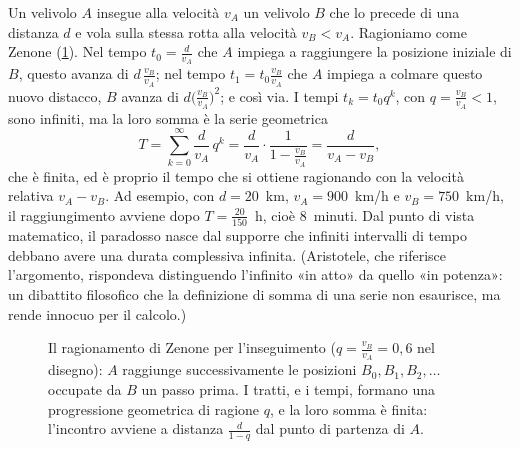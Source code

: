 \begin{idea}
Un velivolo $A$ insegue alla velocità $v_{A}$ un velivolo $B$ che lo precede di una
distanza $d$ e vola sulla stessa rotta alla velocità $v_{B}<v_{A}$. Ragioniamo come
Zenone (\cref{fig:zenone}). Nel tempo $t_{0}=\frac d{v_{A}}$ che $A$ impiega a raggiungere la
posizione iniziale di $B$, questo avanza di $d\,\frac{v_{B}}{v_{A}}$; nel tempo $t_{1}=t_{0}\frac{v_{B}}{v_{A}}$ che
$A$ impiega a colmare questo nuovo distacco, $B$ avanza di $d\bigl(\frac{v_{B}}{v_{A}}\bigr)^{2}$; e così
via. I tempi $t_{k}=t_{0}q^{k}$, con $q=\frac{v_{B}}{v_{A}}<1$, sono infiniti, ma la loro somma è la
serie geometrica
\[
  T=\sum_{k=0}^{\infty}\frac d{v_{A}}\,q^{k}=\frac d{v_{A}}\cdot\frac1{1-\frac{v_{B}}{v_{A}}}=\frac d{v_{A}-v_{B}} ,
\]
che è finita, ed è proprio il tempo che si ottiene ragionando con la velocità relativa
$v_{A}-v_{B}$. Ad esempio, con $d=20$~km, $v_{A}=900$~km/h e $v_{B}=750$~km/h, il
raggiungimento avviene dopo $T=\frac{20}{150}$~h, cioè $8$~minuti. Dal punto di vista matematico, il
paradosso nasce dal supporre che infiniti intervalli di tempo debbano avere una durata
complessiva infinita. (Aristotele, che riferisce l'argomento, rispondeva distinguendo
l'infinito «in atto» da quello «in potenza»: un dibattito filosofico che la definizione
di somma di una serie non esaurisce, ma rende innocuo per il calcolo.)
\end{idea}

\begin{figure}[htb]
\centering
{}
\caption{Il ragionamento di Zenone per l'inseguimento ($q=\frac{v_{B}}{v_{A}}=0{,}6$ nel disegno):
$A$ raggiunge successivamente le posizioni $B_{0},B_{1},B_{2},\dots$ occupate da $B$ un passo
prima. I tratti, e i tempi, formano una progressione geometrica di ragione $q$, e la loro
somma è finita: l'incontro avviene a distanza $\frac d{1-q}$ dal punto di partenza di $A$.}
\label{fig:zenone}
\end{figure}

